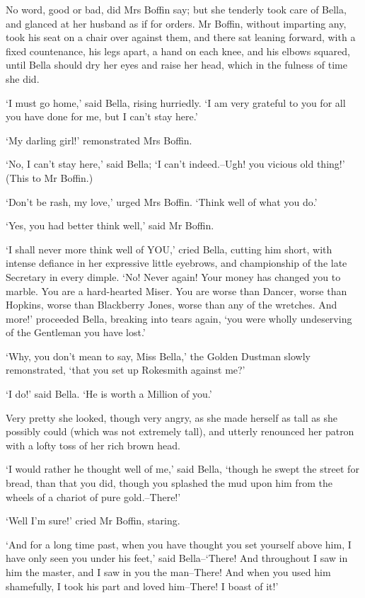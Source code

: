 No word, good or bad, did Mrs Boffin say; but she tenderly took care of
Bella, and glanced at her husband as if for orders. Mr Boffin, without
imparting any, took his seat on a chair over against them, and there
sat leaning forward, with a fixed countenance, his legs apart, a hand on
each knee, and his elbows squared, until Bella should dry her eyes and
raise her head, which in the fulness of time she did.

‘I must go home,’ said Bella, rising hurriedly. ‘I am very grateful to
you for all you have done for me, but I can’t stay here.’

‘My darling girl!’ remonstrated Mrs Boffin.

‘No, I can’t stay here,’ said Bella; ‘I can’t indeed.--Ugh! you vicious
old thing!’ (This to Mr Boffin.)

‘Don’t be rash, my love,’ urged Mrs Boffin. ‘Think well of what you do.’

‘Yes, you had better think well,’ said Mr Boffin.

‘I shall never more think well of YOU,’ cried Bella, cutting him
short, with intense defiance in her expressive little eyebrows, and
championship of the late Secretary in every dimple. ‘No! Never again!
Your money has changed you to marble. You are a hard-hearted Miser. You
are worse than Dancer, worse than Hopkins, worse than Blackberry Jones,
worse than any of the wretches. And more!’ proceeded Bella, breaking
into tears again, ‘you were wholly undeserving of the Gentleman you have
lost.’

‘Why, you don’t mean to say, Miss Bella,’ the Golden Dustman slowly
remonstrated, ‘that you set up Rokesmith against me?’

‘I do!’ said Bella. ‘He is worth a Million of you.’

Very pretty she looked, though very angry, as she made herself as
tall as she possibly could (which was not extremely tall), and utterly
renounced her patron with a lofty toss of her rich brown head.

‘I would rather he thought well of me,’ said Bella, ‘though he swept the
street for bread, than that you did, though you splashed the mud upon
him from the wheels of a chariot of pure gold.--There!’

‘Well I’m sure!’ cried Mr Boffin, staring.

‘And for a long time past, when you have thought you set yourself above
him, I have only seen you under his feet,’ said Bella--‘There! And
throughout I saw in him the master, and I saw in you the man--There! And
when you used him shamefully, I took his part and loved him--There! I
boast of it!’

